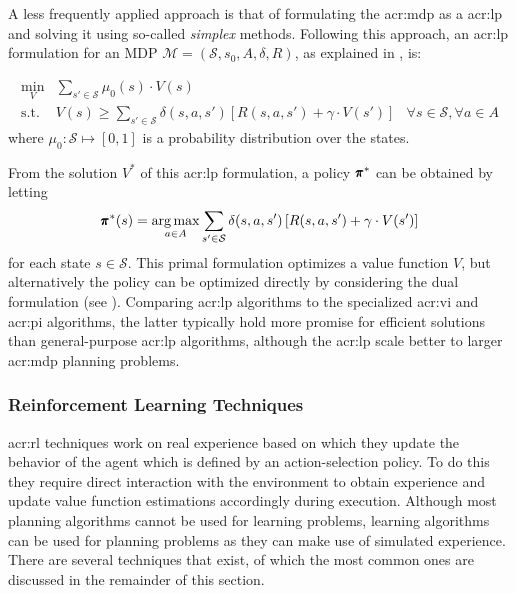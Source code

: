 A less frequently applied approach is that of formulating the \acrshort{acr:mdp} as a \acrfull{acr:lp} and solving it using so-called \textit{simplex} methods.
Following this approach, an \acrshort{acr:lp} formulation for an MDP $\mathcal{M} = (\mathcal{S}, s_0, A, \delta, R)$, as explained in \cite{pazis2012non}, is:

\begin{align}
\min_{V} &\sum_{s' \in \mathcal{S}} \mu_0(s) \cdot V(s) &\nonumber\\
\text{s.t. } &V(s) \geq \sum_{s' \in \mathcal{S}} \delta(s, a, s') \left[R(s,a,s') + \gamma\cdot V(s')\right]	&\forall s \in \mathcal{S}, \forall a \in A
\end{align}
where $\mu_0: \mathcal{S} \mapsto [0,1]$ is a probability distribution over the states.

\noindent From the solution $V^*$ of this \acrshort{acr:lp} formulation, a policy $\pmb{\pi}^*$ can be obtained by letting $$\pmb{\pi}^*(s) = \operatorname*{arg\,max}_{a \in A} \sum_{s' \in \mathcal{S}} \delta(s, a, s') \left[R(s,a,s') + \gamma\cdot V(s')\right]$$ for each state $s \in \mathcal{S}$. 
This primal formulation optimizes a value function $V$, but alternatively the policy can be optimized directly by considering the dual formulation (see \cite{littman1995complexity}).
Comparing \acrshort{acr:lp} algorithms to the specialized \acrshort{acr:vi} and \acrshort{acr:pi} algorithms, the latter typically hold more promise for efficient solutions than general-purpose \acrshort{acr:lp} algorithms, although the \acrshort{acr:lp} scale better to larger \acrshort{acr:mdp} planning problems.

\newpage

\subsubsection{Reinforcement Learning Techniques}
\label{sec:reinforcement-learning}

\acrfull{acr:rl} techniques work on real experience based on which they update the behavior of the agent which is defined by an action-selection policy. To do this they require direct interaction with the environment to obtain experience and update value function estimations accordingly during execution.
Although most planning algorithms cannot be used for learning problems, learning algorithms can be used for planning problems as they can make use of simulated experience.
There are several techniques that exist, of which the most common ones are discussed in the remainder of this section.

